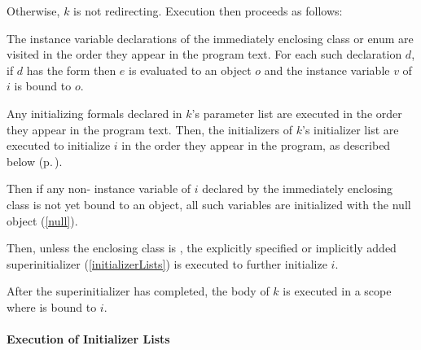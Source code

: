 \documentclass[makeidx]{article}
\begin{document}
\LMHash{}%
Otherwise, $k$ is not redirecting.
Execution then proceeds as follows:

\LMHash{}%
The instance variable declarations of the immediately enclosing class or enum
are visited in the order they appear in the program text.
For each such declaration $d$, if $d$ has the form
then $e$ is evaluated to an object $o$
and the instance variable $v$ of $i$ is bound to $o$.

\LMHash{}%
Any initializing formals declared in $k$'s parameter list
are executed in the order they appear in the program text.
Then, the initializers of $k$'s initializer list are executed to initialize $i$
in the order they appear in the program, as described below
(p.\,\pageref{executionOfInitializerLists}).


\LMHash{}%
Then if any non-\LATE{} instance variable of $i$
declared by the immediately enclosing class
is not yet bound to an object,
all such variables are initialized with the null object (\ref{null}).


\LMHash{}%
Then, unless the enclosing class is , the explicitly specified or
implicitly added superinitializer (\ref{initializerLists}) is executed to
further initialize $i$.

\LMHash{}%
After the superinitializer has completed, the body of $k$ is executed
in a scope where \THIS{} is bound to $i$.



\paragraph{Execution of Initializer Lists}
\end{document}
